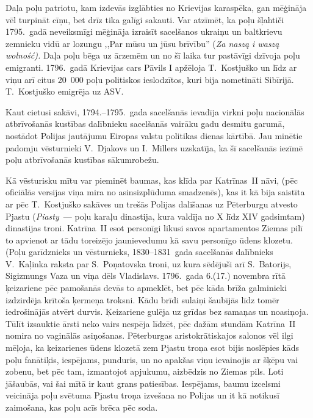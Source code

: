 \documentclass[twoside,a5paper,12pt,fleqn,openany]{extbook}
\newcommand{\pltxti}[1]{\textit{\textpolish{#1}}}
\begin{document}
Daļa poļu patriotu, kam izdevās izglābties no Krievijas karaspēka, gan mēģināja vēl turpināt cīņu, bet drīz tika galīgi sakauti. Var atzīmēt, ka poļu šļahtiči 1795.~gadā neveiksmīgi mēģināja izraisīt sacelšanos ukraiņu un baltkrievu zemnieku vidū ar lozungu ,,Par mūsu un jūsu brīvību'' (\pltxti{Za naszą i waszą wolność).} Daļa poļu bēga uz ārzemēm un no šī laika tur pastāvīgi dzīvoja poļu emigranti. 1796.~gadā Krievijas cars Pāvils I apžēloja T.~Kostjuško un līdz ar viņu arī citus 20~000 poļu politiskos ieslodzītos, kuri bija nometināti Sibīrijā. T.~Kostjuško emigrēja uz ASV.

Kaut cietusi sakāvi, 1794.--1795.~gada sacelšanās ievadīja virkni poļu nacionālās atbrīvošanās kustības dalībnieku sacelšanās vairāku gadu desmitu garumā, nostādot Polijas jautājumu Eiropas valstu politikas dienas kārtībā. Jau minētie padomju vēsturnieki V.~Djakovs un I.~Millers uzskatīja, ka šī sacelšanās iezīmē poļu atbrīvošanās kustības sākumrobežu.

Kā vēsturisku mītu var pieminēt baumas, kas klīda par Katrīnas~II nāvi, (pēc oficiālās versijas viņa mira no asinsizplūduma smadzenēs), kas it kā bija saistīta ar pēc T.~Kostjuško sakāves un trešās Polijas dalīšanas uz Pēterburgu atvesto Pjastu (\pltxti{Piasty}~--- poļu karaļu dinastija, kura valdīja no X līdz XIV gadsimtam) dinastijas troni. Katrīna~II esot personīgi likusi savos apartamentos Ziemas pilī to apvienot ar tādu toreizējo jaunievedumu kā savu personīgo ūdens klozetu. (Poļu garīdznieks un vēsturnieks, 1830--1831~gada sacelšanās dalībnieks V.~Kaļinka raksta par S.~Poņatovska troni, uz kura sēdējuši arī S.~Batorijs, Sigizmungs Vaza un viņa dēls Vladislavs. 1796.~gada 6.(17.) novembra rītā ķeizariene pēc pamošanās devās to apmeklēt, bet pēc kāda brīža galminieki izdzirdēja krītoša ķermeņa troksni. Kādu brīdi sulaiņi šaubījās līdz tomēr iedrošinājās atvērt durvis. Ķeizariene gulēja uz grīdas bez samaņas un noasiņoja. Tūlīt izsauktie ārsti neko vairs nespēja līdzēt, pēc dažām stundām Katrīna~II nomira no vaginālās asiņošanas. Pēterburgas aristokrātiskajos salonos vēl ilgi mēļoja, ka ķeizarienes ūdens klozetā zem Pjastu troņa esot bijis noslēpies kāds poļu fanātiķis, iespējams, punduris, un no apakšas viņu ievainojis ar šķēpu vai zobenu, bet pēc tam, izmantojot apjukumu, aizbēdzis no Ziemas pils. Loti jāšaubās, vai šai mītā ir kaut grans patiesības. Iespējams, baumu izcelsmi veicināja poļu svētuma Pjastu troņa izvešana no Polijas un it kā notikusī zaimošana, kas poļu acīs brēca pēc soda.
\end{document}
